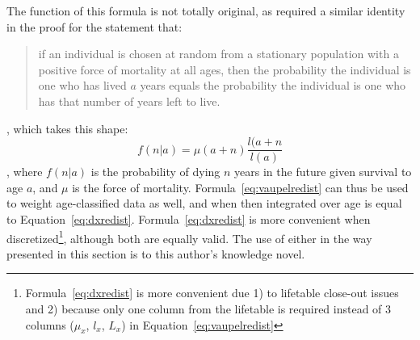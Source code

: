 The function of this formula is not totally original, as \citet{vaupel2009life}
required a similar identity in the proof for the statement that:
\begin{quotation}
if an individual is chosen at random from a stationary population with a positive force
of mortality at all ages, then the probability the individual is one who has lived $a$ years
equals the probability the individual is one who has that number of years left to live.
\end{quotation}
, which takes this shape:
\begin{equation}
\label{eq:vaupelredist}
f(n | a) = \mu (a+n) \frac{l(a+n}{l(a)}
\end{equation}
, where $f(n | a) $ is the probability of dying $n$ years in the future given
survival to age $a$, and $\mu$ is the force of mortality.
Formula~\eqref{eq:vaupelredist} can thus be used to weight age-classified data
as well, and when then integrated over age is equal to
Equation~\eqref{eq:dxredist}. Formula~\eqref{eq:dxredist} is more convenient when 
discretized\footnote{Formula~\eqref{eq:dxredist} is more convenient due 1) to lifetable 
close-out issues and 2) because only one column from the lifetable is required instead 
of 3 columns ($\mu_x$, $l_x$, $L_x$) in
Equation~\eqref{eq:vaupelredist} }, although both are equally valid.
The use of either in the way presented in this section is to this author's knowledge novel.

